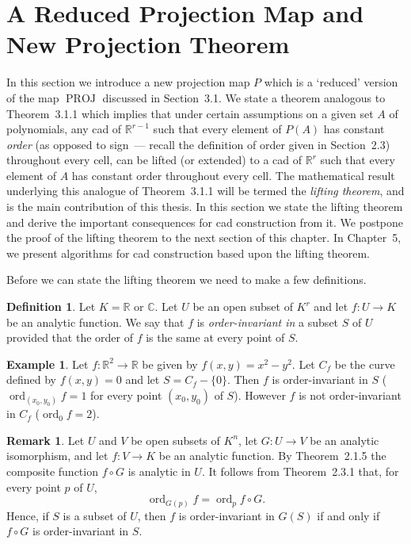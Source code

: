 \documentclass[11pt]{article}
\theoremstyle{plain}
\theoremstyle{definition}
\newtheorem*{definition}{Definition}
\newtheorem*{example}{Example}
\newtheorem*{remark}{Remark}
\newcommand{\R}{\mathbb{R}}
\newcommand{\C}{\mathbb{C}}
\DeclareMathOperator{\ord}{ord}
\DeclareMathOperator{\PROJ}{PROJ}
\begin{document}
\section{A Reduced Projection Map and New Projection Theorem}

In this section we introduce a new projection map $P$ which is a
`reduced' version of the map $\PROJ$ discussed in Section~3.1. We state
a theorem analogous to Theorem~3.1.1 which implies that under certain
assumptions on a given set $A$ of polynomials, any cad of $\R^{r-1}$
such that every element of $P(A)$ has constant \emph{order} (as
opposed to sign~--- recall the definition of order given in
Section~2.3) throughout every cell, can be lifted (or extended) to a
cad of $\R^r$ such that every element of $A$ has constant order
throughout every cell. The mathematical result underlying this
analogue of Theorem~3.1.1 will be termed the \emph{lifting theorem},
and is the main contribution of this thesis. In this section we state
the lifting theorem and derive the important consequences for cad
construction from it. We postpone the proof of the lifting theorem to
the next section of this chapter. In Chapter~5, we present algorithms
for cad construction based upon the lifting theorem.

Before we can state the lifting theorem we need to make a few
definitions.

\begin{definition}
Let $K = \R$ or $\C$. Let $U$ be an open subset of $K^r$ and let
$f: U \to K$ be an analytic function. We say that $f$ is
\emph{order-invariant in} a subset $S$ of $U$ provided that the order
of $f$ is the same at every point of $S$.
\end{definition}

\begin{example}
Let $f: \R^2 \to \R$ be given by $f(x, y) = x^2 - y^2$. Let $C_f$ be
the curve defined by $f(x, y) = 0$ and let $S = C_f - \{0\}$. Then $f$
is order-invariant in $S$ ($\ord_{(x_0, y_0)} f = 1$ for every point
$(x_0, y_0)$ of $S$). However $f$ is not order-invariant in $C_f$
($\ord_0 f = 2$).
\end{example}

\begin{remark}
Let $U$ and $V$ be open subsets of $K^n$, let $G: U \to V$ be an
analytic isomorphism, and let $f: V \to K$ be an analytic function. By
Theorem~2.1.5 the composite function $f \circ G$ is analytic in $U$.
It follows from Theorem~2.3.1 that, for every point $p$ of $U$,
\[
\ord_{G(p)} f = \ord_p f \circ G.
\]
Hence, if $S$ is a subset of $U$, then $f$ is order-invariant in
$G(S)$ if and only if $f \circ G$ is order-invariant in $S$.
\end{remark}
\end{document}
